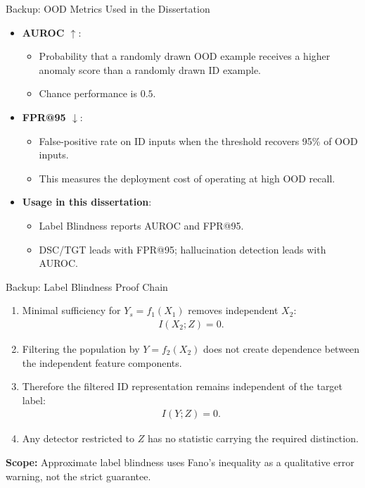 \documentclass[aspectratio=1610]{beamer}
\newcommand{\scopefooter}[1]{%
  \vfill
  \begin{center}
    \footnotesize\textbf{Scope:} #1
  \end{center}%
}
\begin{document}
\begin{frame}{Backup: OOD Metrics Used in the Dissertation}
\begin{itemize}
  \item \textbf{AUROC $\uparrow$}:
  \begin{itemize}
    \item Probability that a randomly drawn OOD example receives a higher anomaly score than a randomly drawn ID example.
    \item Chance performance is $0.5$.
  \end{itemize}
  \item \textbf{FPR@95 $\downarrow$}:
  \begin{itemize}
    \item False-positive rate on ID inputs when the threshold recovers 95\% of OOD inputs.
    \item This measures the deployment cost of operating at high OOD recall.
  \end{itemize}
  \item \textbf{Usage in this dissertation}:
  \begin{itemize}
    \item Label Blindness reports AUROC and FPR@95.
    \item DSC/TGT leads with FPR@95; hallucination detection leads with AUROC.
  \end{itemize}
\end{itemize}
\end{frame}

\begin{frame}{Backup: Label Blindness Proof Chain}
\begin{enumerate}
  \item Minimal sufficiency for $Y_s=f_1(X_1)$ removes independent $X_2$:
  \begin{align*}
    I(X_2;Z)=0.
  \end{align*}
  \item Filtering the population by $Y=f_2(X_2)$ does not create dependence between the independent feature components.
  \item Therefore the filtered ID representation remains independent of the target label:
  \begin{align*}
    I(Y;Z)=0.
  \end{align*}
  \item Any detector restricted to $Z$ has no statistic carrying the required distinction.
\end{enumerate}
\scopefooter{Approximate label blindness uses Fano's inequality as a qualitative error warning, not the strict guarantee.}
\end{frame}
\end{document}
